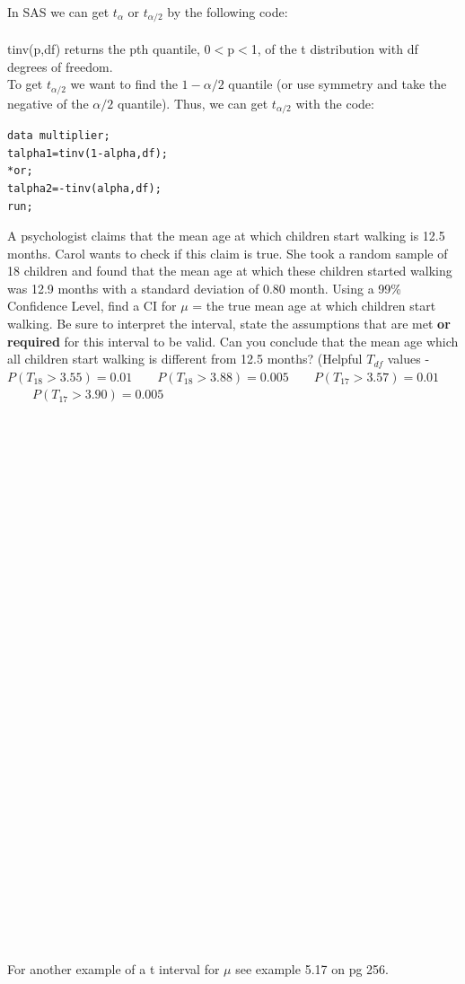 \newpage

In SAS we can get $t_{\alpha}$ or $t_{\alpha/2}$ by the following code:\\~\\
tinv(p,df) returns the pth quantile, 0$<$p$<$1, of the t distribution with df degrees of freedom.  \\
To get $t_{\alpha/2}$ we want to find the $1-\alpha/2$ quantile (or use symmetry and take the negative of the $\alpha/2$ quantile).  Thus, we can get $t_{\alpha/2}$ with the code:\\
\begin{verbatim}
data multiplier;
talpha1=tinv(1-alpha,df);
*or;
talpha2=-tinv(alpha,df);
run;
\end{verbatim}

A psychologist claims that the mean age at which children start walking is 12.5 months. Carol wants to check if this claim is true. She took a random sample of 18 children and found that the mean age at which these children started walking was 12.9 months with a standard deviation of 0.80 month. Using a 99\% Confidence Level, find a CI for $\mu$ = the true mean age at which children start walking.  Be sure to interpret the interval, state the assumptions that are met \textbf{or required} for this interval to be valid.  Can you conclude that the mean age which all children start walking is different from 12.5 months? (Helpful $T_{df}$ values - $P(T_{18}>3.55)=0.01$~~~~$P(T_{18}>3.88)=0.005$~~~~$P(T_{17}>3.57)=0.01$~~~~$P(T_{17}>3.90)=0.005$

~\\~\\~\\~\\~\\~\\~\\~\\~\\~\\~\\~\\~\\~\\~\\~\\~\\~\\~\\~\\~\\~\\~\\~\\~\\~\\~\\~\\~\\~\\~\\
For another example of a t interval for $\mu$ see example 5.17 on pg 256.

